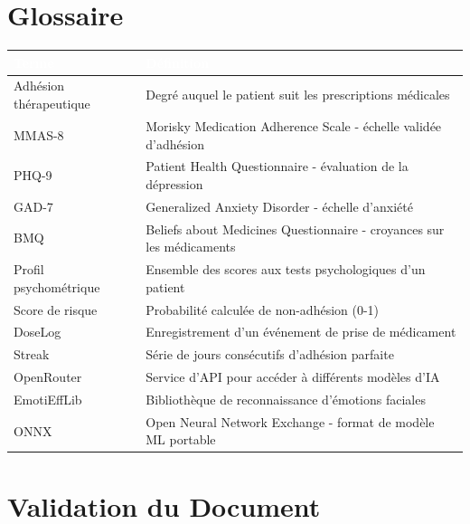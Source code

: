 \documentclass[12pt,a4paper]{report}
\begin{document}
\newpage

\chapter{Glossaire}

\begin{tabularx}{\textwidth}{|l|X|}
    \hline
    \rowcolor{emsiblue}\textcolor{white}{\textbf{Terme}} & \textcolor{white}{\textbf{Définition}} \\
    \hline
    Adhésion thérapeutique & Degré auquel le patient suit les prescriptions médicales \\
    \hline
    MMAS-8 & Morisky Medication Adherence Scale - échelle validée d'adhésion \\
    \hline
    PHQ-9 & Patient Health Questionnaire - évaluation de la dépression \\
    \hline
    GAD-7 & Generalized Anxiety Disorder - échelle d'anxiété \\
    \hline
    BMQ & Beliefs about Medicines Questionnaire - croyances sur les médicaments \\
    \hline
    Profil psychométrique & Ensemble des scores aux tests psychologiques d'un patient \\
    \hline
    Score de risque & Probabilité calculée de non-adhésion (0-1) \\
    \hline
    DoseLog & Enregistrement d'un événement de prise de médicament \\
    \hline
    Streak & Série de jours consécutifs d'adhésion parfaite \\
    \hline
    OpenRouter & Service d'API pour accéder à différents modèles d'IA \\
    \hline
    EmotiEffLib & Bibliothèque de reconnaissance d'émotions faciales \\
    \hline
    ONNX & Open Neural Network Exchange - format de modèle ML portable \\
    \hline
\end{tabularx}

\newpage

\chapter*{Validation du Document}
\end{document}
